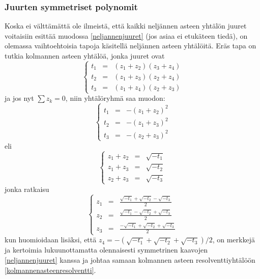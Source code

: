 \documentclass[a4paper]{article}
\begin{document}
\subsubsection{Juurten symmetriset polynomit}
Koska ei välttämättä ole ilmeistä, että kaikki neljännen asteen yhtälön juuret voitaisiin esittää muodossa \ref{neljannenjuuret} (jos asiaa ei etukäteen tiedä), on olemassa vaihtoehtoisia tapoja käsitellä neljännen asteen yhtälöitä. Eräs tapa on tutkia kolmannen asteen yhtälöä, jonka juuret ovat
$$
\left\{
\begin{array}{ccc}
  t_1 & = & (z_1+z_2)(z_3+z_4) \\
  t_2 & = & (z_1+z_3)(z_2+z_4) \\
  t_3 & = & (z_1+z_4)(z_2+z_3)
\end{array}
\right.
$$
ja jos nyt $\sum z_k=0$, niin yhtälöryhmä saa muodon:
$$
\left\{
\begin{array}{ccc}
  t_1 & = & -(z_1+z_2)^2 \\
  t_2 & = & -(z_1+z_3)^2 \\
  t_3 & = & -(z_2+z_3)^2
\end{array}
\right.
$$
eli
$$
\left\{
\begin{array}{ccc}
  z_1+z_2 & = & \sqrt{-t_1} \\
  z_1+z_3 & = & \sqrt{-t_2} \\
  z_2+z_3 & = & \sqrt{-t_3}
\end{array}
\right.
$$
jonka ratkaisu
$$
\left\{
\begin{array}{ccc}
  z_1 & = & \frac{\sqrt{-t_1}+\sqrt{-t_2}-\sqrt{-t_3}}{2} \\
  z_2 & = & \frac{\sqrt{-t_1}-\sqrt{-t_2}+\sqrt{-t_3}}{2} \\
  z_3 & = & \frac{-\sqrt{-t_1}+\sqrt{-t_2}+\sqrt{-t_3}}{2}
\end{array}
\right.
$$
kun huomioidaan lisäksi, että $z_4=-(\sqrt{-t_1}+\sqrt{-t_2}+\sqrt{-t_3})/2$, on merkkejä ja kertoimia lukuunottamatta olennaisesti symmetrinen kaavojen \ref{neljannenjuuret} kanssa ja johtaa samaan kolmannen asteen resolventtiyhtälöön \ref{kolmannenasteenresolventti}.
\end{document}
